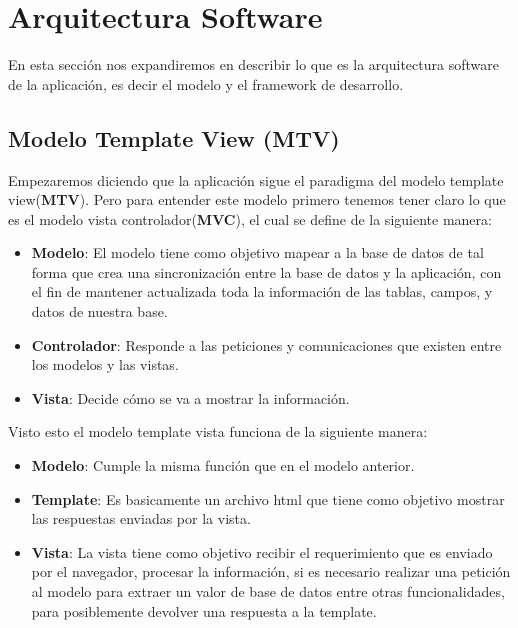 \section{Arquitectura Software}
\label{2:sec2}

En esta sección nos expandiremos en describir lo que es la arquitectura software de la aplicación, es decir el modelo y el framework de desarrollo.\\


\subsection{Modelo Template View (MTV)}
Empezaremos diciendo que la aplicación sigue el paradigma del modelo template view(\textbf{MTV}).
Pero para entender este modelo primero tenemos tener claro lo que es el modelo vista controlador(\textbf{MVC}), el cual se define de la siguiente manera:\\

\begin{itemize}
  \item \textbf{Modelo}: El modelo tiene como objetivo mapear a la base de datos de tal forma que crea una sincronización
			  entre la base de datos y la aplicación, con el fin de mantener actualizada toda la información de 
			  las tablas, campos, y datos de nuestra base. 
  \item \textbf{Controlador}: Responde a las peticiones y comunicaciones que existen entre los modelos y las vistas.
  \item \textbf{Vista}: Decide cómo se va a mostrar la información. 
\end{itemize}

Visto esto el modelo template vista funciona de la siguiente manera:\\


\begin{itemize}
  \item \textbf{Modelo}: Cumple la misma función que en el modelo anterior.
  \item \textbf{Template}: Es basicamente un archivo html que tiene como objetivo mostrar las respuestas enviadas por la vista.
  \item \textbf{Vista}: La vista tiene como objetivo recibir el requerimiento que es enviado por el navegador, procesar la información,
			 si es necesario realizar una petición al modelo para extraer un valor de base de datos entre otras funcionalidades, para posiblemente
			 devolver una respuesta a la template.
\end{itemize}


